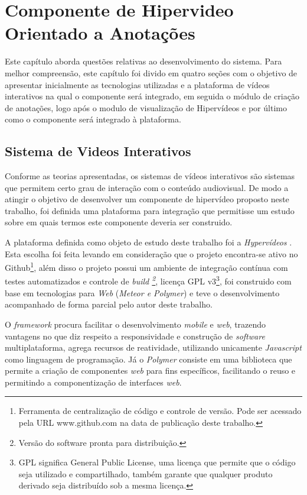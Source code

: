 \chapter[Componente de Hipervideo Orientado a Anotações]{Componente de Hipervideo Orientado a Anotações}

Este capítulo aborda questões relativas ao desenvolvimento do sistema. Para melhor compreensão, este capítulo foi divido em quatro seções com o objetivo de apresentar inicialmente as tecnologias utilizadas e a plataforma de vídeos interativos na qual o componente será integrado, em seguida o módulo de criação de anotações, logo após o modulo de visualização de Hipervídeos e por último como o componente será integrado à plataforma.

\section{Sistema de Videos Interativos}

Conforme as teorias apresentadas, os sistemas de vídeos interativos são sistemas que permitem certo grau de interação com o conteúdo audiovisual. De modo a atingir o objetivo de desenvolver um componente de hipervídeo proposto neste trabalho, foi definida uma plataforma para integração que permitisse um estudo sobre em quais termos este componente deveria ser construido.

A plataforma definida como objeto de estudo deste trabalho foi a \textit{Hypervídeos} \cite{arthurtcc}. Esta escolha foi feita levando em consideração que o projeto encontra-se ativo no Github\footnote{Ferramenta de centralização de código e controle de versão. Pode ser acessado pela URL www.github.com na data de publicação deste trabalho.}, além disso o projeto possui um ambiente de integração contínua com testes automatizados e controle de \textit{build \footnote{Versão do software pronta para distribuição.}}, licença GPL v3\footnote{GPL significa General Public License, uma licença que permite que o código seja utilizado e compartilhado, também garante que qualquer produto derivado seja distribuído sob a mesma licença.}, foi construido com base em tecnologias para \textit{Web} (\textit{Meteor e Polymer}) e teve o desenvolvimento acompanhado de forma parcial pelo autor deste trabalho.

O \textit{framework} procura facilitar o desenvolvimento \textit{mobile} e \textit{web}, trazendo vantagens no que diz respeito a responsividade e construção de \textit{software} multiplataforma, agrega recursos de reatividade, utilizando unicamente \textit{Javascript} como linguagem de programação. Já o \textit{Polymer} consiste em uma biblioteca que permite a criação de componentes \textit{web} para fins específicos, facilitando o reuso e permitindo a componentização de interfaces \textit{web}.

